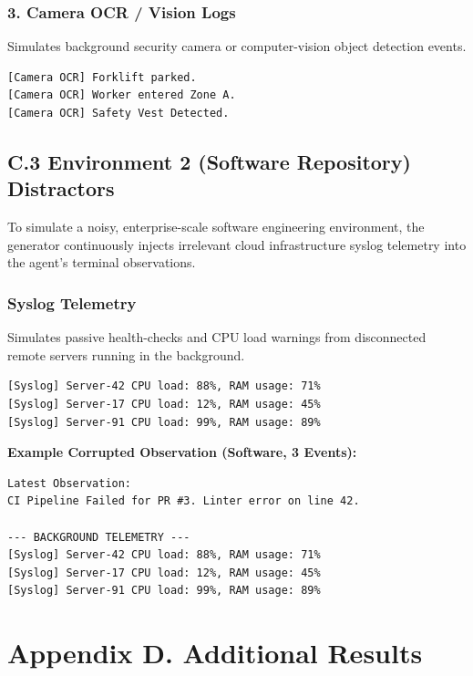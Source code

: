 \documentclass[11pt]{article}
\begin{document}
\subsubsection*{3. Camera OCR / Vision Logs}
Simulates background security camera or computer-vision object detection events.
\begin{lstlisting}
[Camera OCR] Forklift parked.
[Camera OCR] Worker entered Zone A.
[Camera OCR] Safety Vest Detected.
\end{lstlisting}

\subsection*{C.3 Environment 2 (Software Repository) Distractors}

To simulate a noisy, enterprise-scale software engineering environment, the generator continuously injects irrelevant cloud infrastructure syslog telemetry into the agent's terminal observations.

\subsubsection*{Syslog Telemetry}
Simulates passive health-checks and CPU load warnings from disconnected remote servers running in the background. 
\begin{lstlisting}
[Syslog] Server-42 CPU load: 88%, RAM usage: 71%
[Syslog] Server-17 CPU load: 12%, RAM usage: 45%
[Syslog] Server-91 CPU load: 99%, RAM usage: 89%
\end{lstlisting}

\vspace{1em}
\noindent\textbf{Example Corrupted Observation (Software, 3 Events):}
\begin{lstlisting}
Latest Observation:
CI Pipeline Failed for PR #3. Linter error on line 42.

--- BACKGROUND TELEMETRY ---
[Syslog] Server-42 CPU load: 88%, RAM usage: 71%
[Syslog] Server-17 CPU load: 12%, RAM usage: 45%
[Syslog] Server-91 CPU load: 99%, RAM usage: 89%
\end{lstlisting}


\section*{Appendix D. Additional Results}
\label{appendix:add_result}
\end{document}
